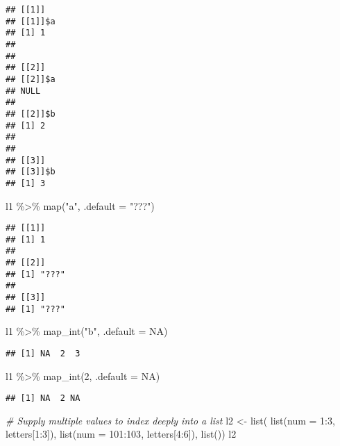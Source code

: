 \documentclass[
]{book}
\newenvironment{Shaded}{\begin{snugshade}}{\end{snugshade}}
\newcommand{\AttributeTok}[1]{\textcolor[rgb]{0.77,0.63,0.00}{#1}}
\newcommand{\CommentTok}[1]{\textcolor[rgb]{0.56,0.35,0.01}{\textit{#1}}}
\newcommand{\ConstantTok}[1]{\textcolor[rgb]{0.00,0.00,0.00}{#1}}
\newcommand{\DecValTok}[1]{\textcolor[rgb]{0.00,0.00,0.81}{#1}}
\newcommand{\FunctionTok}[1]{\textcolor[rgb]{0.00,0.00,0.00}{#1}}
\newcommand{\NormalTok}[1]{#1}
\newcommand{\OtherTok}[1]{\textcolor[rgb]{0.56,0.35,0.01}{#1}}
\newcommand{\SpecialCharTok}[1]{\textcolor[rgb]{0.00,0.00,0.00}{#1}}
\newcommand{\StringTok}[1]{\textcolor[rgb]{0.31,0.60,0.02}{#1}}
\begin{document}
\begin{verbatim}
## [[1]]
## [[1]]$a
## [1] 1
## 
## 
## [[2]]
## [[2]]$a
## NULL
## 
## [[2]]$b
## [1] 2
## 
## 
## [[3]]
## [[3]]$b
## [1] 3
\end{verbatim}

\begin{Shaded}
\begin{Highlighting}[]
\NormalTok{l1 }\SpecialCharTok{\%\textgreater{}\%} 
  \FunctionTok{map}\NormalTok{(}\StringTok{"a"}\NormalTok{, }\AttributeTok{.default =} \StringTok{"???"}\NormalTok{)}
\end{Highlighting}
\end{Shaded}

\begin{verbatim}
## [[1]]
## [1] 1
## 
## [[2]]
## [1] "???"
## 
## [[3]]
## [1] "???"
\end{verbatim}

\begin{Shaded}
\begin{Highlighting}[]
\NormalTok{l1 }\SpecialCharTok{\%\textgreater{}\%} 
  \FunctionTok{map\_int}\NormalTok{(}\StringTok{"b"}\NormalTok{, }\AttributeTok{.default =} \ConstantTok{NA}\NormalTok{)}
\end{Highlighting}
\end{Shaded}

\begin{verbatim}
## [1] NA  2  3
\end{verbatim}

\begin{Shaded}
\begin{Highlighting}[]
\NormalTok{l1 }\SpecialCharTok{\%\textgreater{}\%} 
  \FunctionTok{map\_int}\NormalTok{(}\DecValTok{2}\NormalTok{, }\AttributeTok{.default =} \ConstantTok{NA}\NormalTok{)}
\end{Highlighting}
\end{Shaded}

\begin{verbatim}
## [1] NA  2 NA
\end{verbatim}

\begin{Shaded}
\begin{Highlighting}[]
\CommentTok{\# Supply multiple values to index deeply into a list}
\NormalTok{l2 }\OtherTok{\textless{}{-}} \FunctionTok{list}\NormalTok{(}
  \FunctionTok{list}\NormalTok{(}\AttributeTok{num =} \DecValTok{1}\SpecialCharTok{:}\DecValTok{3}\NormalTok{,     letters[}\DecValTok{1}\SpecialCharTok{:}\DecValTok{3}\NormalTok{]),}
  \FunctionTok{list}\NormalTok{(}\AttributeTok{num =} \DecValTok{101}\SpecialCharTok{:}\DecValTok{103}\NormalTok{, letters[}\DecValTok{4}\SpecialCharTok{:}\DecValTok{6}\NormalTok{]),}
  \FunctionTok{list}\NormalTok{())}
\NormalTok{l2}
\end{Highlighting}
\end{Shaded}
\end{document}
